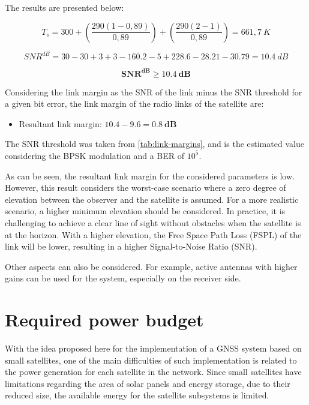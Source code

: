 The results are presented below:

\begin{equation}
    T_{s} = 300 + \left( \frac{290 (1 - 0,89)}{0,89} \right) + \left( \frac{290 (2 - 1)}{0,89} \right) = 661,7\ K
\end{equation}

\begin{equation}
    SNR^{dB} = 30 - 30 + 3 + 3 - 160.2 - 5 + 228.6 - 28.21 - 30.79 = 10.4\ dB
\end{equation}

\begin{equation}
\mathbf{SNR^{dB} \geq 10.4\ dB}
\end{equation}

Considering the link margin as the SNR of the link minus the SNR threshold for a given bit error, the link margin of the radio links of the satellite are:

\begin{itemize}
    \item Resultant link margin: $10.4 - 9.6 = \mathbf{0.8\ dB}$
\end{itemize}

The SNR threshold was taken from \autoref{tab:link-margins}, and is the estimated value considering the BPSK modulation and a BER of $10^{5}$.

As can be seen, the resultant link margin for the considered parameters is low. However, this result considers the worst-case scenario where a zero degree of elevation between the observer and the satellite is assumed. For a more realistic scenario, a higher minimum elevation should be considered. In practice, it is challenging to achieve a clear line of sight without obstacles when the satellite is at the horizon. With a higher elevation, the Free Space Path Loss (FSPL) of the link will be lower, resulting in a higher Signal-to-Noise Ratio (SNR).

Other aspects can also be considered. For example, active antennas with higher gains can be used for the system, especially on the receiver side.

\section{Required power budget}

With the idea proposed here for the implementation of a GNSS system based on small satellites, one of the main difficulties of such implementation is related to the power generation for each satellite in the network. Since small satellites have limitations regarding the area of solar panels and energy storage, due to their reduced size, the available energy for the satellite subsystems is limited.

